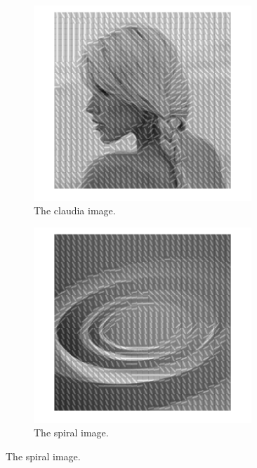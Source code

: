 \begin{figure}
	\centering
	\begin{subfigure}[b]{0.3\textwidth}
		\centering
		\includegraphics[clip, trim=2cm 0cm 2cm 0cm, width=0.9\textwidth]{figures/claudia-32x32}
		\caption{The claudia image.}
		\label{fig:claudia}
	\end{subfigure}
	\begin{subfigure}[b]{0.3\textwidth}
		\centering
		\includegraphics[clip, trim=2cm 0cm 2cm 0cm, width=0.9\textwidth]{figures/spiral-32x32}
		\caption{The spiral image.}
		\label{fig:spiral}
	\end{subfigure}

\end{figure}
